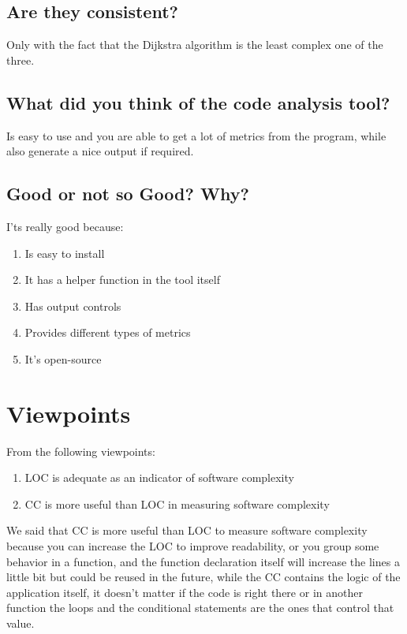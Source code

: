 \subsection{Are they consistent?}
Only with the fact that the Dijkstra algorithm is the least complex one of the three.
\subsection{What did you think of the code analysis tool?}
Is easy to use and you are able to get a lot of metrics from the program, while also generate a nice output if required.

\subsection{Good or not so Good? Why?}
I'ts really good because:
\begin{enumerate}
    \item Is easy to install
    \item It has a helper function in the tool itself
    \item Has output controls
    \item Provides different types of metrics
    \item It's open-source
\end{enumerate}

\pagebreak

\section{Viewpoints}
From the following viewpoints:
\begin{enumerate}
    \item LOC is adequate as an indicator of software complexity
    \item CC is more useful than LOC in measuring software complexity
\end{enumerate}

\noindent 
We said that CC is more useful than LOC to measure software complexity because you can increase the LOC to improve readability, or you group some behavior in a function, and the function declaration itself will increase the lines a little bit but could be reused in the future, while the CC contains the logic of the application itself, it doesn't matter if the code is right there or in another function the loops and the conditional statements are the ones that control that value.